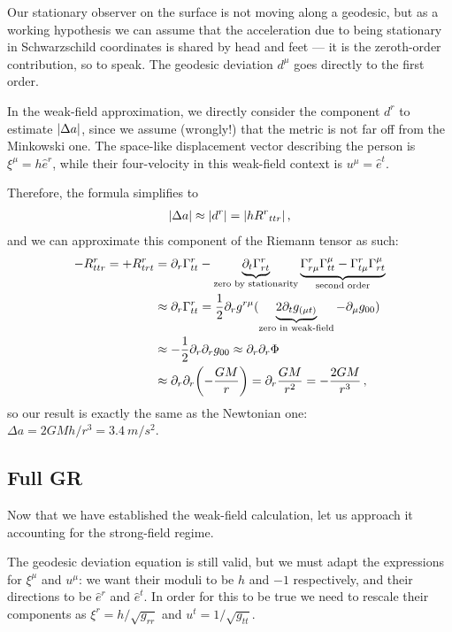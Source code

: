 \documentclass[main.tex]{subfiles}
\begin{document}
Our stationary observer on the surface is not moving along a geodesic, but as a working hypothesis we can assume that
the acceleration due to being stationary in Schwarzschild coordinates is shared by head and feet --- it is the zeroth-order contribution, so to speak. 
The geodesic deviation \(d^{\mu }\) goes directly to the first order. 

In the weak-field approximation, we directly consider the component \(d^{r}\) to estimate \(\abs{\Delta a}\), since we assume (wrongly!) that the metric is not far off from the Minkowski one.
The space-like displacement vector describing the person is \(\xi^{\mu } = h \hat{e}^{r}\), while their four-velocity in this weak-field context is \(u^{\mu } = \hat{e}^{t}\). 

Therefore, the formula simplifies to 
%
\begin{align}
\abs{\Delta a} \approx \abs{d^{r}} = \abs{h R^{r}{}_{ttr} }
\,,
\end{align}
%
and we can approximate this component of the Riemann tensor as such: 
%
\begin{align}
-R^{r}_{ttr} =
+R^{r}_{trt} &= \partial_{r} \Gamma^{r}_{tt} - \underbrace{\partial_t \Gamma^{r}_{rt}}_{\text{zero by stationarity}}
\underbrace{\Gamma^{r}_{r \mu } \Gamma^{\mu }_{tt} - \Gamma^{r}_{t \mu } \Gamma^{\mu}_{r t}}_{\text{second order}}  \\
&\approx \partial_{r} \Gamma^{r}_{tt} = \frac{1}{2} \partial_{r} g^{r \mu } (\underbrace{2\partial_{t} g_{(\mu t)}}_{\text{zero in weak-field}}  - \partial_{\mu } g_{00})  \\
&\approx - \frac{1}{2} \partial_{r} \partial_{r} g_{00} 
\approx \partial_{r} \partial_{r} \Phi  \\
&\approx \partial_{r} \partial_{r} \qty(- \frac{GM}{r}) = \partial_{r} \frac{GM}{r^2} = - \frac{2GM}{r^3}
\,,
\end{align}
%
so our result is exactly the same as the Newtonian one: \(\Delta a = 2GM h / r^3 = \SI{3.4}{m / s^2}\). 

\subsection{Full GR}

Now that we have established the weak-field calculation, let us approach it accounting for the strong-field regime. 

The geodesic deviation equation is still valid, but we must adapt the expressions for \(\xi^{\mu }\) and \(u^{\mu }\): 
we want their moduli to be \(h\) and \(-1\) respectively, and their directions to be \(\hat{e}^{r} \) and \(\hat{e}^{t}\).
In order for this to be true we need to rescale their components as \(\xi^{r} = h / \sqrt{g_{rr}}\) and \(u^{t} = 1/\sqrt{g_{tt}}\). 
\end{document}
